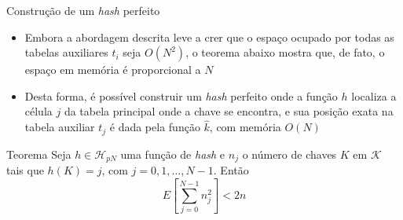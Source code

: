 \begin{frame}[fragile]{Construção de um {\it hash} perfeito}

    \begin{itemize}
        \item Embora a abordagem descrita leve a crer que o espaço ocupado por todas as 
            tabelas auxiliares $t_i$ seja $O(N^2)$, o teorema abaixo mostra que, de fato,
            o espaço em memória é proporcional a $N$

        \item Desta forma, é possível construir um \textit{hash} perfeito onde a função $h$ localiza
            a célula $j$ da tabela principal onde a chave se encontra, e sua posição exata na
            tabela auxiliar $t_j$ é dada pela função $\hat{k}$, com memória $O(N)$

    \end{itemize}

    \begin{block}{Teorema}
        Seja $h \in \mathcal{H}_{pN}$ uma função de \textit{hash} e $n_j$ o número de chaves $K$ em
            $\mathcal{K}$ tais que $h(K) = j$, com $j = 0, 1, \ldots, N - 1$. Então
            \[
                E\left[ \sum_{j = 0}^{N - 1} n_j^2\right] < 2n
            \]
    \end{block}

\end{frame}




